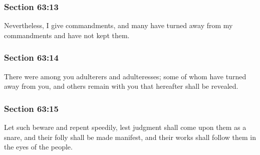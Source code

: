 	\subsubsection{Section 63:13} %
		\label{DC63-13}

		Nevertheless, I give commandments, and many have turned away from my commandments and have not kept them.


	\subsubsection{Section 63:14} %
		\label{DC63-14}

		There were among you adulterers and adulteresses; some of whom have turned away from you, and others remain with you that hereafter shall be revealed.


	\subsubsection{Section 63:15} %
		\label{DC63-15}

		Let such beware and repent speedily, lest judgment shall come upon them as a snare, and their folly shall be made manifest, and their works shall follow them in the eyes of the people.


